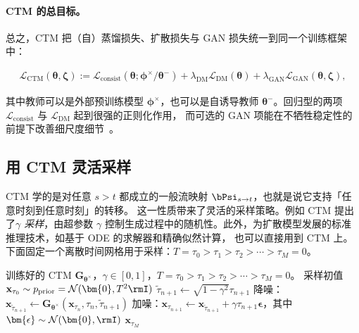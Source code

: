 \paragraph{CTM 的总目标。}
总之，CTM 把（自）蒸馏损失、扩散损失与 GAN 损失统一到同一个训练框架中：
\begin{mdframed}
    \begin{align*}
\mathcal{L}_{\mathrm{CTM}}(\bm{\theta},\bm{\zeta})
:=  \mathcal{L}_{\mathrm{consist}}(\bm{\theta};  \bm{\phi}^\times/\bm{\theta}^-)
+ \lambda_{\mathrm{DM}} \mathcal{L}_{\mathrm{DM}}(\bm{\theta})
+ \lambda_{\mathrm{GAN}} \mathcal{L}_{\mathrm{GAN}}(\bm{\theta},\bm{\zeta}),
\end{align*}
\end{mdframed}
其中教师可以是外部预训练模型 $\bm{\phi}^\times$，也可以是自诱导教师 $\bm{\theta}^-$。回归型的两项
$\mathcal{L}_{\mathrm{consist}}$ 与 $\mathcal{L}_{\mathrm{DM}}$ 起到很强的正则化作用，
而可选的 GAN 项能在不牺牲稳定性的前提下改善细尺度细节~\citep{kim2024pagoda}。


\subsection{用 CTM 灵活采样}
CTM 学的是对任意 $s>t$ 都成立的一般流映射 $\bPsi_{s\to t}$，也就是说它支持「任意时刻到任意时刻」的转移。
这一性质带来了灵活的采样策略。例如 CTM 提出了\emph{$\gamma$ 采样}，由超参数 $\gamma$
控制生成过程中的随机性。此外，为扩散模型发展的标准推理技术，如基于 ODE 的求解器和精确似然计算，
也可以直接用到 CTM 上。下面固定一个离散时间网格用于采样：$T=\tau_0 > \tau_1 > \tau_2 > \cdots > \tau_{M}=0$。

\begin{algorithm}[H]
    \centering
    \caption{CTM 的 $\gamma$ 采样}\label{alg:gamma}
    \begin{algorithmic}[1]
    \Require 训练好的 CTM $\mathbf{G}_{\bm{\theta}^\times}$，$\gamma\in[0,1]$，$T=\tau_0>\tau_1 > \tau_2 > \cdots > \tau_{M}=0$。
    \State 采样初值 $\mathbf{x}_{\tau_{0}}\sim p_{\mathrm{prior}}=\mathcal{N}(\bm{0}, T^2\rmI)$
        \State $\tilde{\tau}_{n+1}\leftarrow \sqrt{1-\gamma^{2}}\tau_{n+1}$
        \State 降噪：$\mathbf{x}_{\tilde{\tau}_{n+1}}\leftarrow \mathbf{G}_{\bm{\theta}^\times}(\mathbf{x}_{\tau_{n}},\tau_{n},\tilde{\tau}_{n+1})$
        \State 加噪：$\mathbf{x}_{\tau_{n+1}}\leftarrow\mathbf{x}_{\tilde{\tau}_{n+1}}+\gamma \tau_{n+1}\bm{\epsilon}$，其中 $\bm{\epsilon}\sim\mathcal{N}(\bm{0}, \rmI)$
        \EndFor
        \Ensure  $\mathbf{x}_{\tau_{M}}$
    \end{algorithmic}
\end{algorithm}

